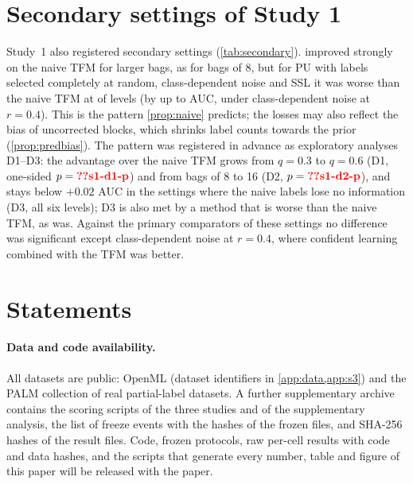 \begin{table}[!htbp]
\centering
\caption{Datasets ($n$ after removing duplicates; $^\ast$subsampled to 10{,}000 rows by the registered rule; S1:
flagged for the sensitivity analysis).}
\label{tab:datasets}
\scriptsize
\setlength{\tabcolsep}{3.5pt}

\end{table}

\FloatBarrier
\section{Secondary settings of Study 1}\label{app:secondary}
Study~1 also registered secondary settings (\cref{tab:secondary}). \ours{} improved strongly on the naive TFM for larger
bags, as for bags of 8, but for PU with labels selected completely at random, class-dependent noise and SSL it was
worse than the naive TFM at  of  levels (by up to  AUC,
under class-dependent noise at $r=0.4$). This is the pattern \cref{prop:naive} predicts; the losses may also reflect the
bias of uncorrected blocks, which shrinks label counts towards the prior (\cref{prop:predbias}). The pattern was registered in advance
as exploratory analyses D1--D3: the advantage over the naive TFM grows from $q=0.3$ to $q=0.6$ (D1, one-sided
$p=\val{s1-d1-p}$) and from bags of 8 to 16 (D2, $p=\val{s1-d2-p}$), and stays below $+0.02$ AUC in the settings where
the naive labels lose no information (D3, all six levels); D3 is also met by a method that is worse than the naive TFM,
as \ours{} was. Against the primary comparators of these
settings no difference was significant except class-dependent noise at $r=0.4$, where confident learning combined with the
TFM was better.

\begin{table}[!htbp]
\centering
\caption{Study~1 secondary settings (TabPFN~v2). $\Delta$ positive favours \ours{}. $^\dagger$Log loss after matching the
known class prior (sign flipped so that positive is better).}
\label{tab:secondary}
\small
\resizebox{\textwidth}{!}{}
\end{table}

\FloatBarrier
\section{Statements}\label{app:statements}
\paragraph{Data and code availability.} All datasets are public: OpenML (dataset identifiers in \cref{app:data,app:s3})
and the PALM collection of real partial-label datasets. A further supplementary archive contains the scoring scripts of
the three studies and of the supplementary analysis, the list of freeze events with the hashes of the frozen files, and
SHA-256 hashes of the result files. Code, frozen protocols, raw per-cell results with code and data hashes, and the scripts that generate
every number, table and figure of this paper will be released with the paper.

